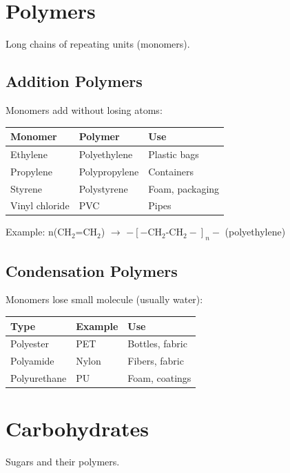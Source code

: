\documentclass[
  11pt,
  letterpaper,
  twoside,
  openright]{book}
\begin{document}
\section{Polymers}\label{polymers}

Long chains of repeating units (monomers).

\subsection{Addition Polymers}\label{addition-polymers}

Monomers add without losing atoms:

\begin{longtable}[]{@{}lll@{}}
\toprule\noalign{}
Monomer & Polymer & Use \\
\midrule\noalign{}
\endhead
\bottomrule\noalign{}
\endlastfoot
Ethylene & Polyethylene & Plastic bags \\
Propylene & Polypropylene & Containers \\
Styrene & Polystyrene & Foam, packaging \\
Vinyl chloride & PVC & Pipes \\
\end{longtable}

Example: n(\(\text{CH}_2\text{=CH}_2\)) \(\to\)
\(-[-\text{CH}_2\text{-CH}_2-]_n-\) (polyethylene)

\subsection{Condensation Polymers}\label{condensation-polymers}

Monomers lose small molecule (usually water):

\begin{longtable}[]{@{}lll@{}}
\toprule\noalign{}
Type & Example & Use \\
\midrule\noalign{}
\endhead
\bottomrule\noalign{}
\endlastfoot
Polyester & PET & Bottles, fabric \\
Polyamide & Nylon & Fibers, fabric \\
Polyurethane & PU & Foam, coatings \\
\end{longtable}

\section{Carbohydrates}\label{carbohydrates}

Sugars and their polymers.
\end{document}
